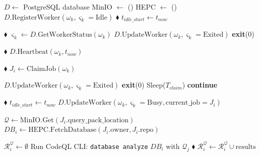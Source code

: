 \documentclass[11pt]{article}
\newcommand{\reporoot}{/Users/mhohn5/c/example/psa-mrva/mrvacommander}
\newcommand{\gomark}[2]{\href{vscode://file\reporoot/#1:#2}{\textcolor{gray!90}{$\blacklozenge$}}}
\begin{document}
\begin{algorithmic}[1]

      \State {}
      \State $D \gets$ PostgreSQL database
      \State MinIO $\gets$ ()
      \State HEPC $\gets$ ()
      \State $D.\text{RegisterWorker}(\omega_k, \varsigma_k = \text{Idle})$
      \gomark{pkg/state/state\_postgres.go}{938}
      \State $t_{idle\_start} \gets t_{now}$


        \State {}
        \gomark{pkg/state/state\_postgres.go}{978}
        \State $\varsigma_k \gets D.\text{GetWorkerStatus}(\omega_k)$
          \State $D.\text{UpdateWorker}(\omega_k, \varsigma_k = \text{Exited})$
          \State \textbf{exit}(0)
        \EndIf

        \State {}
        \gomark{pkg/state/state\_postgres.go}{959}
        \State $D.\text{Heartbeat}(\omega_k, t_{now})$

        \State {}
        \gomark{pkg/state/state\_postgres.go}{1027}
        \State $J_i \gets \text{ClaimJob}(\omega_k)$

            \State $D.\text{UpdateWorker}(\omega_k, \varsigma_k = \text{Exited})$
            \State \textbf{exit}(0) 
          \EndIf
          \State Sleep($T_{claim}$)
          \State \textbf{continue}
        \EndIf

        \State {}
        \gomark{pkg/agent/agent.go}{88}
        \State $t_{idle\_start} \gets t_{now}$ 
        \State $D.\text{UpdateWorker}(\omega_k, \varsigma_k = \text{Busy},
          \text{current\_job} = J_i)$

        \State $\mathcal{Q} \gets \text{MinIO}.\text{Get}(J_i.\text{query\_pack\_location})$
        \State $DB_i \gets \text{HEPC}.\text{FetchDatabase}(J_i.\text{owner},
          J_i.\text{repo})$

        \State $\mathcal{R}_i^{\mathcal{Q}} \gets \emptyset$
          \State Run CodeQL CLI: \texttt{database analyze} $DB_i$ with $\mathcal{Q}_j$
          \gomark{pkg/codeql/codeql.go}{126}
          \State $\mathcal{R}_i^{\mathcal{Q}} \gets \mathcal{R}_i^{\mathcal{Q}} \cup
            \text{results}$
        \EndFor


\end{algorithmic}
\end{document}
